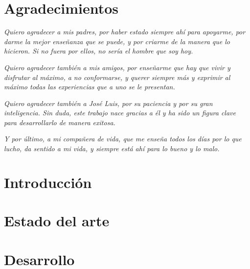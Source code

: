 \documentclass[12pt,a4paper]{report}
\begin{document}
\chapter*{Agradecimientos}
\noindent \textit{Quiero agradecer a mis padres, por haber estado siempre ahí para apoyarme, por darme la mejor enseñanza que se puede, y por criarme de la manera que lo hicieron. Si no fuera por ellos, no sería el hombre que soy hoy.}

\vspace{0.5cm}

\noindent \textit{Quiero agradecer también a mis amigos, por enseñarme que hay que vivir y disfrutar al máximo, a no conformarse, y querer siempre más y exprimir al máximo todas las experiencias que a uno se le presentan.}

\vspace{0.5cm}

\noindent \textit{Quiero agradecer también a José Luis, por su paciencia y por su gran inteligencia. Sin duda, este trabajo nace gracias a él y ha sido un figura clave para desarrollarlo de manera exitosa. }

\vspace{0.5cm}

\noindent \textit{Y por último, a mi compañera de vida, que me enseña todos los días por lo que lucho, da sentido a mi vida, y siempre está ahí para lo bueno y lo malo. }

\listoffigures



\hypersetup{pageanchor=false}
\hypersetup{linkcolor=black}
\tableofcontents


\chapter{Introducción}
\label{sec:cap1}


\chapter{Estado del arte}
\label{sec:cap2}


\chapter{Desarrollo}
\label{sec:cap3}

\end{document}
